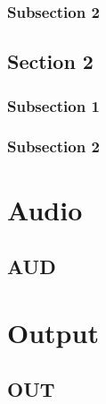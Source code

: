 \documentclass{tufte-book} %
\begin{document}
\subsection{Subsection 2}

\lipsum[7-8]


\section{Section 2}

\subsection{Subsection 1}

\lipsum[9-10]

\subsection{Subsection 2}

\lipsum[11-12]


\chapter{Audio}
\label{ch:2}

\section{AUD}



\chapter{Output}
\label{ch:3}

\section{OUT}



\end{document}
